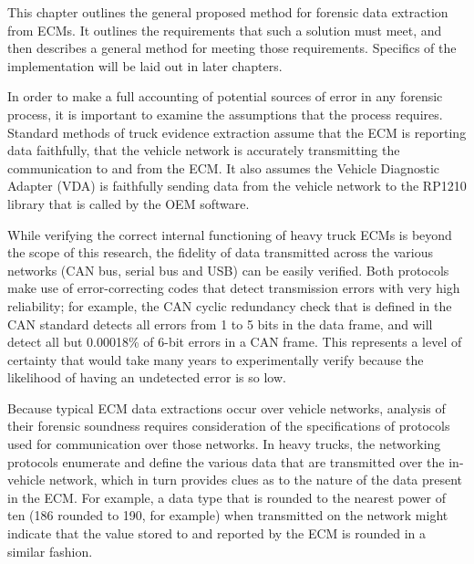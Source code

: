 
This chapter outlines the general proposed method for forensic data extraction from ECMs. It outlines the requirements that such a solution must meet,
and then describes a general method for meeting those requirements. Specifics of the implementation will be laid out in later chapters.



In order to make a full accounting of potential sources of error in any forensic process, it is important to examine the assumptions that the process requires. Standard methods of 
truck evidence extraction assume that the ECM is reporting data faithfully, that the vehicle network is accurately transmitting the communication to and from the ECM. It also assumes 
the Vehicle Diagnostic Adapter (VDA) is faithfully sending data from the vehicle network to the RP1210 library that is called by the OEM software.

While verifying the correct internal functioning of heavy truck ECMs is beyond the scope of this research, the fidelity of data transmitted across the various networks (CAN bus, serial 
bus and USB) can be easily verified. Both protocols make use of error-correcting codes that detect transmission errors with very high reliability; for example, the CAN 
cyclic redundancy check that is defined in the CAN standard detects all errors from 1 to 5 bits in the data frame, and will detect all but 0.00018\% of 6-bit 
errors in a CAN frame\cite{koopman2004}. This represents a level of certainty that would take many years to experimentally verify because the likelihood of having an undetected error is so low.


Because typical ECM data extractions occur over vehicle networks, analysis of their forensic soundness requires consideration of the specifications
of protocols  used for communication over those networks.
In heavy trucks, the networking protocols enumerate and define the various data that are transmitted over the in-vehicle network, which in turn provides clues as to the nature 
of the data present in the ECM. For example, a data type that is rounded to the nearest power of ten (186 rounded to 190, for example) when transmitted on the network might 
indicate that the value stored to and reported by the ECM is rounded in a similar fashion.


